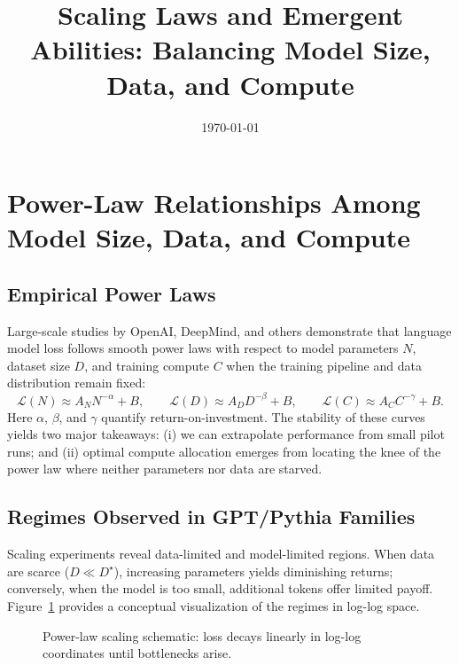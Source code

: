 \documentclass{article}
\title{Scaling Laws and Emergent Abilities: Balancing Model Size, Data, and Compute}
\author{}
\date{\today}
\begin{document}
\maketitle

\section{Power-Law Relationships Among Model Size, Data, and Compute}
\subsection{Empirical Power Laws}
Large-scale studies by OpenAI, DeepMind, and others demonstrate that language model loss follows smooth power laws with respect to model parameters $N$, dataset size $D$, and training compute $C$ when the training pipeline and data distribution remain fixed:
\begin{equation}
  \mathcal{L}(N) \approx A_N N^{-\alpha} + B, \qquad
  \mathcal{L}(D) \approx A_D D^{-\beta} + B, \qquad
  \mathcal{L}(C) \approx A_C C^{-\gamma} + B.
\end{equation}
Here $\alpha$, $\beta$, and $\gamma$ quantify return-on-investment. The stability of these curves yields two major takeaways: (i) we can extrapolate performance from small pilot runs; and (ii) optimal compute allocation emerges from locating the knee of the power law where neither parameters nor data are starved.

\subsection{Regimes Observed in GPT/Pythia Families}
Scaling experiments reveal data-limited and model-limited regions. When data are scarce ($D \ll D^\star$), increasing parameters yields diminishing returns; conversely, when the model is too small, additional tokens offer limited payoff. Figure~\ref{fig:power_law_placeholder_en} provides a conceptual visualization of the regimes in log-log space.

\begin{figure}[H]
  \centering
  \caption{Power-law scaling schematic: loss decays linearly in log-log coordinates until bottlenecks arise.}
  \label{fig:power_law_placeholder_en}
\end{figure}
\FloatBarrier
\end{document}
